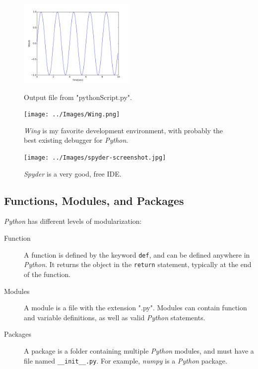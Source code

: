 \begin{figure}
  \centering
  \includegraphics[width=0.5\textwidth]{../Images/Sinewave.png}\\
  \caption{Output file from "pythonScript.py".}
  \label{fig:pythonScript}
\end{figure}


\begin{figure}
  \centering
  \texttt{[image: ../Images/Wing.png]}\\
  \caption{\emph{Wing} is my favorite development environment, with probably the best existing debugger for \emph{Python}.}
\end{figure}

\begin{figure}
  \centering
  \texttt{[image: ../Images/spyder-screenshot.jpg]}\\
  \caption{\emph{Spyder} is a very good, free IDE.}
\end{figure}

\subsection{Functions, Modules, and Packages}

\emph{Python} has different levels of modularization:

\begin{description}
  \item[Function] A \gls{function} is defined by the keyword \lstinline{def}, and can be defined anywhere in \emph{Python}. It returns the object in the \lstinline{return} statement, typically at the end of the function.
  \item[Modules] A \gls{module} is a file with the extension ".py". Modules can contain function and variable definitions, as well as valid \emph{Python} statements.
  \item[Packages] A \gls{package} is a folder containing multiple \emph{Python} modules, and must have a file named \lstinline{__init__.py}. For example, \emph{numpy} is a \emph{Python} package.
\end{description}

